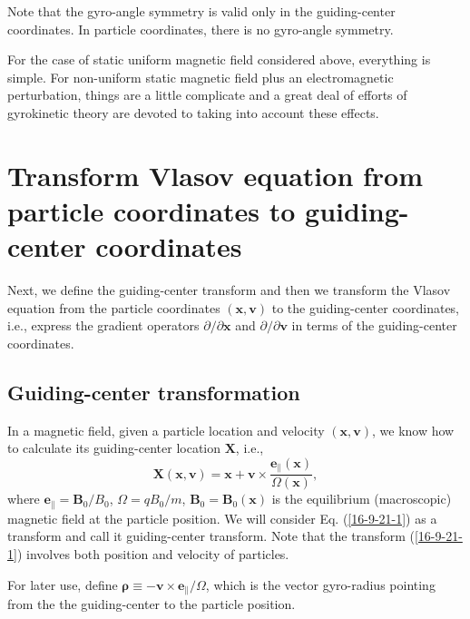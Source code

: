 \documentclass{llncs}
\newcommand{\tmmathbf}[1]{\ensuremath{\boldsymbol{#1}}}
\begin{document}
Note that the gyro-angle symmetry is valid only in the guiding-center
coordinates. In particle coordinates, there is no gyro-angle symmetry.

For the case of static uniform magnetic field considered above, everything is
simple. For non-uniform static magnetic field plus an electromagnetic
perturbation, things are a little complicate and a great deal of efforts of
gyrokinetic theory are devoted to taking into account these effects.

\section{Transform Vlasov equation from particle coordinates to guiding-center
coordinates}

Next, we define the guiding-center transform and then we transform the Vlasov
equation from the particle coordinates $(\mathbf{x}, \mathbf{v})$ to the
guiding-center coordinates, i.e., express the gradient operators $\partial /
\partial \mathbf{x}$ and $\partial / \partial \mathbf{v}$ in terms of the
guiding-center coordinates.

\subsection{Guiding-center transformation}

In a magnetic field, given a particle location and velocity $(\mathbf{x},
\mathbf{v})$, we know how to calculate its guiding-center location
$\mathbf{X}$, i.e.,
\begin{equation}
  \label{16-9-21-1} \mathbf{X} (\mathbf{x}, \mathbf{v}) =\mathbf{x}+\mathbf{v}
  \times \frac{\tmmathbf{e}_{\parallel} (\mathbf{x})}{\Omega (\mathbf{x})},
\end{equation}
where $\tmmathbf{e}_{\parallel} =\mathbf{B}_0 / B_0$, $\Omega = q B_0 / m$,
$\mathbf{B}_0 =\mathbf{B}_0 (\mathbf{x})$ is the equilibrium (macroscopic)
magnetic field at the particle position. We will consider Eq.
(\ref{16-9-21-1}) as a transform and call it guiding-center
transform{\cite{Catto1978}}. Note that the transform (\ref{16-9-21-1})
involves both position and velocity of particles.

For later use, define $\tmmathbf{\rho} \equiv -\mathbf{v} \times
\mathbf{e}_{\parallel} / \Omega$, which is the vector gyro-radius pointing
from the the guiding-center to the particle position.
\end{document}
